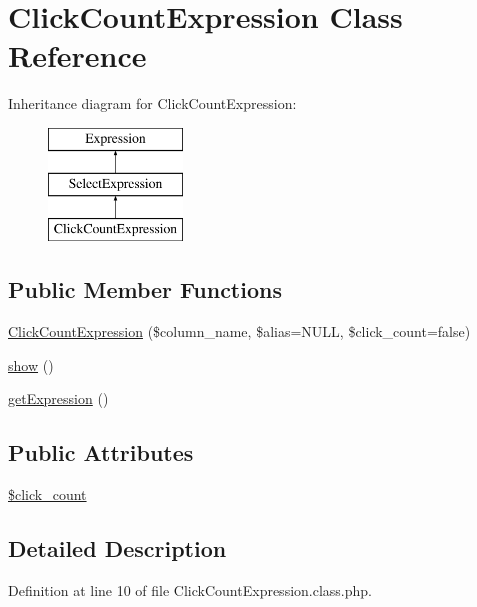 \hypertarget{classClickCountExpression}{\section{Click\+Count\+Expression Class Reference}
\label{classClickCountExpression}
}
Inheritance diagram for Click\+Count\+Expression\+:\begin{figure}[H]
\begin{center}
\leavevmode
\includegraphics[height=3.000000cm]{classClickCountExpression}
\end{center}
\end{figure}
\subsection*{Public Member Functions}
\begin{DoxyCompactItemize}
\item 
\hyperlink{classClickCountExpression_afc3cb0cccfbcad19bf50ef591d77318b}{Click\+Count\+Expression} (\$column\+\_\+name, \$alias=N\+U\+L\+L, \$click\+\_\+count=false)
\item 
\hyperlink{classClickCountExpression_a19b7767f37c3dd3461db66b741ff83f6}{show} ()
\item 
\hyperlink{classClickCountExpression_acd86ecac8f6416d56024e241ba115473}{get\+Expression} ()
\end{DoxyCompactItemize}
\subsection*{Public Attributes}
\begin{DoxyCompactItemize}
\item 
\hyperlink{classClickCountExpression_ae2f2beae2bcbb1e22dac9f84853a1226}{\$click\+\_\+count}
\end{DoxyCompactItemize}


\subsection{Detailed Description}


Definition at line 10 of file Click\+Count\+Expression.\+class.\+php.



